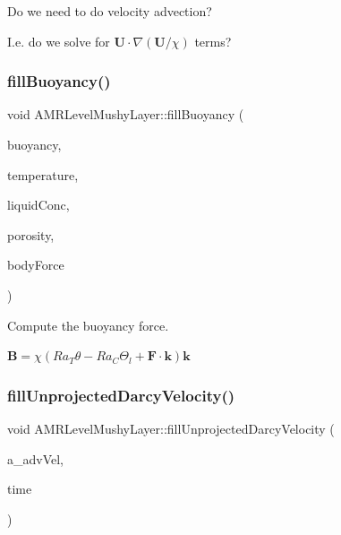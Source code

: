Do we need to do velocity advection? 

I.\+e. do we solve for $ \mathbf{U} \cdot \nabla (\mathbf{U}/\chi) $ terms? \mbox{\label{class_a_m_r_level_mushy_layer_a33522b27aabe2763e57c66c2ab4e2e09}} 
\subsubsection{\texorpdfstring{fill\+Buoyancy()}{fillBuoyancy()}}
{\footnotesize\ttfamily void A\+M\+R\+Level\+Mushy\+Layer\+::fill\+Buoyancy (\begin{DoxyParamCaption}\item[{\textbf{ F\+Array\+Box} \&}]{buoyancy,  }\item[{\textbf{ F\+Array\+Box} \&}]{temperature,  }\item[{\textbf{ F\+Array\+Box} \&}]{liquid\+Conc,  }\item[{\textbf{ F\+Array\+Box} \&}]{porosity,  }\item[{\textbf{ F\+Array\+Box} \&}]{body\+Force }\end{DoxyParamCaption})\hspace{0.3cm}{\ttfamily [protected]}}



Compute the buoyancy force. 

$ \mathbf{B} = \chi ( Ra_T \theta - Ra_C \Theta_l + \mathbf{F} \cdot \mathbf{k} ) \mathbf{k} $ \mbox{\label{class_a_m_r_level_mushy_layer_a67558aa3b7d4e0e04f06c44b54f8ab1e}} 
\subsubsection{\texorpdfstring{fill\+Unprojected\+Darcy\+Velocity()}{fillUnprojectedDarcyVelocity()}}
{\footnotesize\ttfamily void A\+M\+R\+Level\+Mushy\+Layer\+::fill\+Unprojected\+Darcy\+Velocity (\begin{DoxyParamCaption}\item[{\textbf{ Level\+Data}$<$ \textbf{ Flux\+Box} $>$ \&}]{a\+\_\+adv\+Vel,  }\item[{\textbf{ Real}}]{time }\end{DoxyParamCaption})\hspace{0.3cm}{\ttfamily [protected]}}



